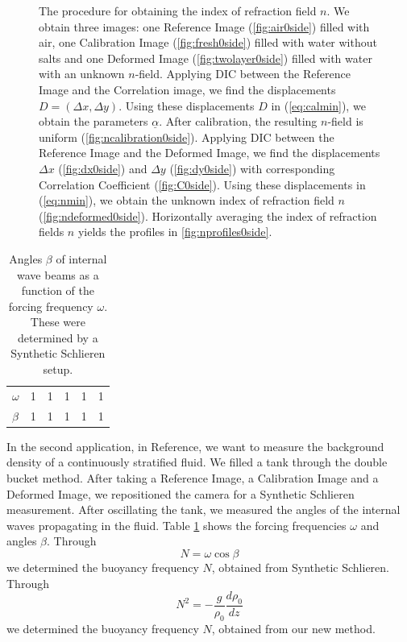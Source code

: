 \documentclass[smallextended]{svjour3}       %
\begin{document}
\begin{figure}[htbp]
\caption{The procedure for obtaining the index of refraction field $n$. We obtain three images: one Reference Image (\ref{fig:air0side}) filled with air, one Calibration Image (\ref{fig:fresh0side}) filled with water without salts and one Deformed Image (\ref{fig:twolayer0side}) filled with water with an unknown $n$-field. Applying DIC between the Reference Image and the Correlation image, we find the displacements $D=(\Delta x, \Delta y)$. Using these displacements $D$ in (\ref{eq:calmin}), we obtain the parameters $\underline{\alpha}$. After calibration, the resulting $n$-field is uniform (\ref{fig:ncalibration0side}). Applying DIC between the Reference Image and the Deformed Image, we find the displacements $\Delta x$ (\ref{fig:dx0side}) and $\Delta y$ (\ref{fig:dy0side}) with corresponding Correlation Coefficient (\ref{fig:C0side}).  Using these displacements in (\ref{eq:nmin}), we obtain the unknown index of refraction field $n$ (\ref{fig:ndeformed0side}). Horizontally averaging the index of refraction fields $n$ yields the profiles in \ref{fig:nprofiles0side}.}
\label{fig:0side}
\end{figure}

\begin{table}[htbp]
\caption{Angles $\beta$ of internal wave beams as a function of the forcing frequency $\omega$. These were determined by a Synthetic Schlieren setup.}
\label{tab:SSintwav}
\centering
\begin{tabular}{llllll}
$\omega$ & 1 & 1 & 1 & 1 & 1  \\
$\beta$  & 1 & 1 & 1 & 1 & 1
\end{tabular}
\end{table}

In the second application, in Reference, we want to measure the background density of a continuously stratified fluid. We filled a tank through the double bucket method. After taking a Reference Image, a Calibration Image and a Deformed Image, we repositioned the camera for a Synthetic Schlieren measurement. After oscillating the tank, we measured the angles of the internal waves propagating in the fluid. Table \ref{tab:SSintwav} shows the forcing frequencies $\omega$ and angles $\beta$. Through
\begin{equation}
	N = \omega \cos \beta
\end{equation}
we determined the buoyancy frequency $N$, obtained from Synthetic Schlieren. Through
\begin{equation}
	N^2 = - \frac{g}{\rho_0}\frac{d \rho_0}{d z}
\end{equation}
we determined the buoyancy frequency $N$, obtained from our new method. 
\end{document}
